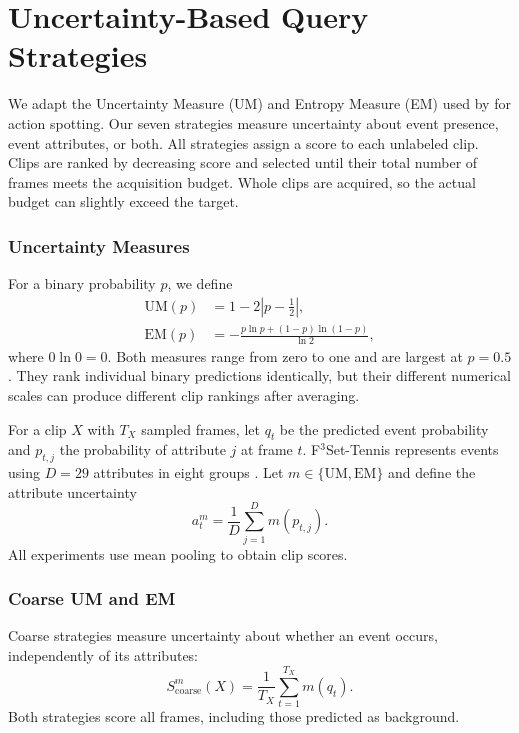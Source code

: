 \section{Uncertainty-Based Query Strategies}
\label{sec:Uncertainty-Based Query Strategies}

We adapt the Uncertainty Measure (UM) and Entropy Measure (EM) used by \textcite{giancola_towards_2023} for action spotting. Our seven strategies measure uncertainty about event presence, event attributes, or both. All strategies assign a score to each unlabeled clip. Clips are ranked by decreasing score and selected until their total number of frames meets the acquisition budget. Whole clips are acquired, so the actual budget can slightly exceed the target.

\subsubsection{Uncertainty Measures}
For a binary probability $p$, we define
\begin{align}
    \mathrm{UM}(p) &= 1-2\left|p-\frac{1}{2}\right|, \\
    \mathrm{EM}(p) &= -\frac{p\ln p+(1-p)\ln(1-p)}{\ln 2},
\end{align}
where $0\ln 0=0$. Both measures range from zero to one and are largest at $p=0.5$. They rank individual binary predictions identically, but their different numerical scales can produce different clip rankings after averaging.

For a clip $X$ with $T_X$ sampled frames, let $q_t$ be the predicted event probability and $p_{t,j}$ the probability of attribute $j$ at frame $t$. F$^3$Set-Tennis represents events using $D=29$ attributes in eight groups \autocite{liu_f3set_2025}. Let $m\in\{\mathrm{UM},\mathrm{EM}\}$ and define the attribute uncertainty
\begin{equation}
    a_t^m=\frac{1}{D}\sum_{j=1}^{D}m(p_{t,j}).
\end{equation}
All experiments use mean pooling to obtain clip scores.

\subsubsection{Coarse UM and EM}
Coarse strategies measure uncertainty about whether an event occurs, independently of its attributes:
\begin{equation}
    S_{\mathrm{coarse}}^m(X)=\frac{1}{T_X}\sum_{t=1}^{T_X}m(q_t).
\end{equation}
Both strategies score all frames, including those predicted as background.

